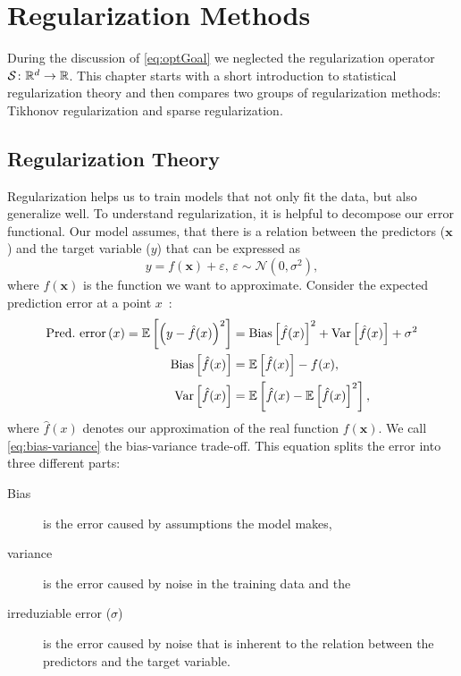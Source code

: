 \chapter{Regularization Methods\label{cha:regularization}}
During the discussion of \vref{eq:optGoal} we neglected the regularization
operator \(\mathcal{S} \colon \mathbb{R}^d \to \mathbb{R}\).
This chapter starts with a short introduction to statistical regularization
theory and then compares two groups of regularization methods:
Tikhonov regularization and sparse regularization.

\section{Regularization Theory}
Regularization helps us to train models that not only fit the data, but also generalize well.
To understand regularization, it is helpful to decompose our error functional.
Our model assumes, that there is a relation between the predictors
(\(\bm{x}\)) and the target variable (\(y\)) that can be expressed as
\begin{equation*}
  y = f(\bm{x}) + \varepsilon,\, \varepsilon \sim \mathcal{N}(0, \sigma^2),
\end{equation*}
where \(f(\bm{x})\) is the function we want to approximate.
Consider the expected prediction error at a point \(x\)~\cite{esl}:
\begin{align}
  \label{eq:bias-variance}
  \text{Pred.~error}\left( x \right) = \operatorname{\operatorname{\mathbb{E}}} \left[ \left(y - \hat{f}(x) \right)^2 \right] &=
              \operatorname{\operatorname{Bias}}\left[\hat{f}(x) \right]^2 + \operatorname{\operatorname{Var}}\left[\hat{f}(x)\right] + \sigma^2 \\
  \operatorname{\operatorname{Bias}} \left[ \hat{f} (x) \right] &= \operatorname{\operatorname{\mathbb{E}}} \left[\hat{f}(x)\right] - f(x), \nonumber \\
  \operatorname{\operatorname{Var}} \left[ \hat{f} (x) \right] &= \operatorname{\operatorname{\mathbb{E}}} \left[ \hat{f}(x) - \operatorname{\operatorname{\mathbb{E}}} \left[ \hat{f}(x) \right]^2 \right] \nonumber,
\end{align}
where \(\hat{f}(x)\) denotes our approximation of the real function \(f(\bm{x})\).
We call \cref{eq:bias-variance} the bias-variance trade-off.
This equation splits the error into three different parts:
\begin{description}
\item[Bias] is the error caused by assumptions the model makes,
\item[variance] is the error caused by noise in the training data and the
\item[irreduziable error (\(\sigma\))] is the error caused by noise that is inherent to the relation between the predictors and the target variable.
\end{description}

